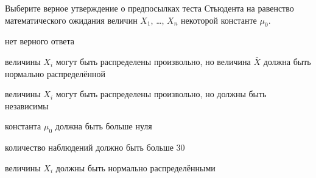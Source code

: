 
\begin{question}
Выберите верное утверждение о предпосылках теста Стьюдента на равенство
математического ожидания величин \(X_1\), \ldots, \(X_n\) некоторой
константе \(\mu_0\).
\begin{answerlist}
  \item нет верного ответа
  \item величины \(X_i\) могут быть распределены произвольно, но величина
\(\bar X\) должна быть нормально распределённой
  \item величины \(X_i\) могут быть распределены произвольно, но должны быть
независимы
  \item константа \(\mu_0\) должна быть больше нуля
  \item количество наблюдений должно быть больше 30
  \item величины \(X_i\) должны быть нормально распределёнными
\end{answerlist}
\end{question}



